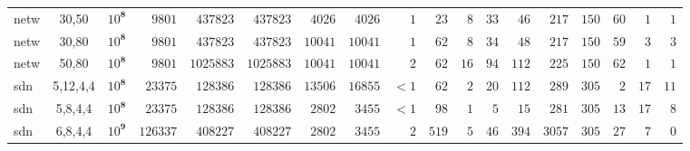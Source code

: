 \documentclass{article}
\begin{document}
\begin{table}[h!]
{\begin{tabular}{lcrrrrrrr||r|rrr||rrrrr}
\textsf{netw} &	\tiny{30,50} &	$10^\textbf{8}$ &	$9801$ &	$437823$ &	$437823$ &	$4026$ &	$4026$ &	$1$ &	$23$ &	$8$ &	$33$ &	$46$ &	$217$ &	$150$ &	$60$ &	$1$ &	$1$\\
\textsf{netw} &	\tiny{30,80} &	$10^\textbf{8}$ &	$9801$ &	$437823$ &	$437823$ &	$10041$ &	$10041$ &	$1$ &	$62$ &	$8$ &	$34$ &	$48$ &	$217$ &	$150$ &	$59$ &	$3$ &	$3$\\
\textsf{netw} &	\tiny{50,80} &	$10^\textbf{8}$ &	$9801$ &	$1025883$ &	$1025883$ &	$10041$ &	$10041$ &	$2$ &	$62$ &	$16$ &	$94$ &	$112$ &	$225$ &	$150$ &	$62$ &	$1$ &	$1$\\
\textsf{sdn} &	\tiny{5,12,4,4} &	$10^\textbf{8}$ &	$23375$ &	$128386$ &	$128386$ &	$13506$ &	$16855$ &	$<1$ &	$62$ &	$2$ &	$20$ &	$112$ &	$289$ &	$305$ &	$2$ &	$17$ &	$11$\\
\textsf{sdn} &	\tiny{5,8,4,4} &	$10^\textbf{8}$ &	$23375$ &	$128386$ &	$128386$ &	$2802$ &	$3455$ &	$<1$ &	$98$ &	$1$ &	$5$ &	$15$ &	$281$ &	$305$ &	$13$ &	$17$ &	$8$\\
\textsf{sdn} &	\tiny{6,8,4,4} &	$10^\textbf{9}$ &	$126337$ &	$408227$ &	$408227$ &	$2802$ &	$3455$ &	$2$ &	$519$ &	$5$ &	$46$ &	$394$ &	$3057$ &	$305$ &	$27$ &	$7$ &	$0$\\

\end{tabular}
}
\end{table}
\end{document}
